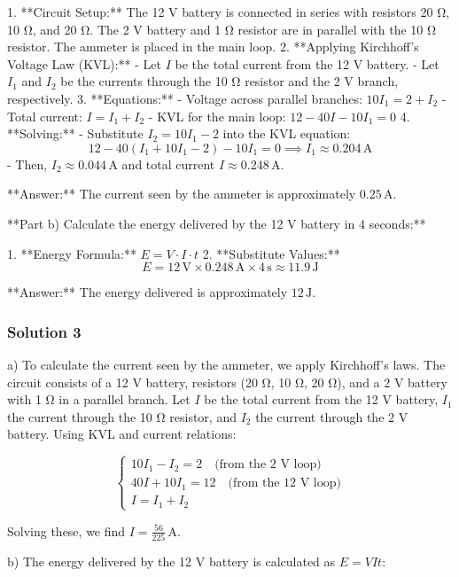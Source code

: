 \documentclass{article}
\begin{document}
1. **Circuit Setup:** The 12 V battery is connected in series with resistors 20 Ω, 10 Ω, and 20 Ω. The 2 V battery and 1 Ω resistor are in parallel with the 10 Ω resistor. The ammeter is placed in the main loop.
2. **Applying Kirchhoff's Voltage Law (KVL):**
   - Let \( I \) be the total current from the 12 V battery.
   - Let \( I_1 \) and \( I_2 \) be the currents through the 10 Ω resistor and the 2 V branch, respectively.
3. **Equations:**
   - Voltage across parallel branches: \( 10I_1 = 2 + I_2 \)
   - Total current: \( I = I_1 + I_2 \)
   - KVL for the main loop: \( 12 - 40I - 10I_1 = 0 \)
4. **Solving:**
   - Substitute \( I_2 = 10I_1 - 2 \) into the KVL equation:
     \[
     12 - 40(I_1 + 10I_1 - 2) - 10I_1 = 0 \implies I_1 \approx 0.204 \, \text{A}
     \]
   - Then, \( I_2 \approx 0.044 \, \text{A} \) and total current \( I \approx 0.248 \, \text{A} \).

**Answer:** The current seen by the ammeter is approximately \(\boxed{0.25 \, \text{A}}\).

**Part b) Calculate the energy delivered by the 12 V battery in 4 seconds:**

1. **Energy Formula:** \( E = V \cdot I \cdot t \)
2. **Substitute Values:**
   \[
   E = 12 \, \text{V} \times 0.248 \, \text{A} \times 4 \, \text{s} \approx 11.9 \, \text{J}
   \]

**Answer:** The energy delivered is approximately \(\boxed{12 \, \text{J}}\).

\subsubsection{Solution 3}
a) To calculate the current seen by the ammeter, we apply Kirchhoff's laws. The circuit consists of a 12 V battery, resistors (20 Ω, 10 Ω, 20 Ω), and a 2 V battery with 1 Ω in a parallel branch. Let \( I \) be the total current from the 12 V battery, \( I_1 \) the current through the 10 Ω resistor, and \( I_2 \) the current through the 2 V battery. Using KVL and current relations:

\[
\begin{cases}
10I_1 - I_2 = 2 \quad \text{(from the 2 V loop)} \\
40I + 10I_1 = 12 \quad \text{(from the 12 V loop)} \\
I = I_1 + I_2
\end{cases}
\]

Solving these, we find \( I = \frac{56}{225} \, \text{A} \).

b) The energy delivered by the 12 V battery is calculated as \( E = VIt \):
\end{document}
